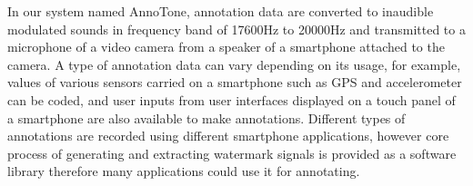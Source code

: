 In our system named AnnoTone, annotation data are converted to inaudible modulated sounds in frequency band of 17600Hz to 20000Hz and transmitted to a microphone of a video camera from a speaker of a smartphone attached to the camera.
A type of annotation data can vary depending on its usage, for example, values of various sensors carried on a smartphone such as GPS and accelerometer can be coded, and user inputs from user interfaces displayed on a touch panel of a smartphone are also available to make annotations.
Different types of annotations are recorded using different smartphone applications, however core process of generating and extracting watermark signals is provided as a software library therefore many applications could use it for annotating.
